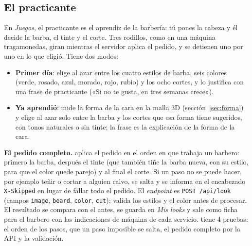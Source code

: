 \subsection{El practicante}
\label{sec:practicante}

En \emph{Juegos}, el practicante es el aprendiz de la barbería: tú pones la cabeza y él decide la barba, el tinte y el corte. Tres rodillos, como en una máquina tragamonedas, giran mientras el servidor aplica el pedido, y se detienen uno por uno en lo que eligió. Tiene dos modos:
\begin{itemize}
  \item \textbf{Primer día}: elige al azar entre los cuatro estilos de barba, seis colores (verde, rosado, azul, morado, rojo, rubio) y los ocho cortes, y lo justifica con una frase de practicante («Si no te gusta, en tres semanas crece»).
  \item \textbf{Ya aprendió}: mide la forma de la cara en la malla 3D (sección~\ref{sec:forma}) y elige al azar solo entre la barba y los cortes que esa forma tiene sugeridos, con tonos naturales o sin tinte; la frase es la explicación de la forma de la cara.
\end{itemize}

\textbf{El pedido completo.}  aplica el pedido en el orden en que trabaja un barbero: primero la barba, después el tinte (que también tiñe la barba nueva, con su estilo, para que el color quede parejo) y al final el corte. Si un paso no se puede hacer, por ejemplo teñir o cortar a alguien calvo, se salta y se informa en el encabezado \texttt{X-Skipped} en lugar de fallar todo el pedido. El \emph{endpoint} es \texttt{POST /api/look} (campos \texttt{image}, \texttt{beard}, \texttt{color}, \texttt{cut}); valida los estilos y el color antes de procesar. El resultado se compara con el antes, se guarda en \emph{Mis looks} y sale como ficha para el barbero con las indicaciones de máquina de cada servicio.  tiene 4 pruebas: el orden de los pasos, que un paso imposible se salta, el pedido completo por la API y la validación.
